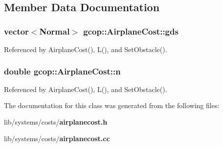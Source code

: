 \subsection{\-Member \-Data \-Documentation}
\subsubsection[{gds}]{\setlength{\rightskip}{0pt plus 5cm}vector$<${\bf \-Normal}$>$ {\bf gcop\-::\-Airplane\-Cost\-::gds}}\label{classgcop_1_1AirplaneCost_abf84687972c3d4f26f61823e8e667e30}


\-Referenced by \-Airplane\-Cost(), \-L(), and \-Set\-Obstacle().

\subsubsection[{n}]{\setlength{\rightskip}{0pt plus 5cm}double {\bf gcop\-::\-Airplane\-Cost\-::n}}\label{classgcop_1_1AirplaneCost_a27db56f1f0cc60bdc390338eee5dd609}


\-Referenced by \-Airplane\-Cost(), \-L(), and \-Set\-Obstacle().



\-The documentation for this class was generated from the following files\-:\begin{DoxyCompactItemize}
\item 
lib/systems/costs/{\bf airplanecost.\-h}\item 
lib/systems/costs/{\bf airplanecost.\-cc}\end{DoxyCompactItemize}
